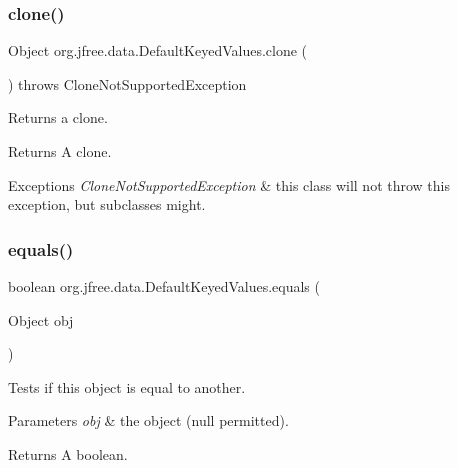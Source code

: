 \subsubsection{\texorpdfstring{clone()}{clone()}}
{\footnotesize\ttfamily Object org.\+jfree.\+data.\+Default\+Keyed\+Values.\+clone (\begin{DoxyParamCaption}{ }\end{DoxyParamCaption}) throws Clone\+Not\+Supported\+Exception}

Returns a clone.

\begin{DoxyReturn}{Returns}
A clone.
\end{DoxyReturn}

\begin{DoxyExceptions}{Exceptions}
{\em Clone\+Not\+Supported\+Exception} & this class will not throw this exception, but subclasses might. \\
\hline
\end{DoxyExceptions}
\mbox{\label{classorg_1_1jfree_1_1data_1_1_default_keyed_values_ac0f4c07bb87728f0365be0624fd3a48d}} 
\subsubsection{\texorpdfstring{equals()}{equals()}}
{\footnotesize\ttfamily boolean org.\+jfree.\+data.\+Default\+Keyed\+Values.\+equals (\begin{DoxyParamCaption}\item[{Object}]{obj }\end{DoxyParamCaption})}

Tests if this object is equal to another.


\begin{DoxyParams}{Parameters}
{\em obj} & the object ({\ttfamily null} permitted).\\
\hline
\end{DoxyParams}
\begin{DoxyReturn}{Returns}
A boolean. 
\end{DoxyReturn}
\mbox{\label{classorg_1_1jfree_1_1data_1_1_default_keyed_values_ac6e5a5ef8dc8c3c34e4aac48514d30d5}} 
